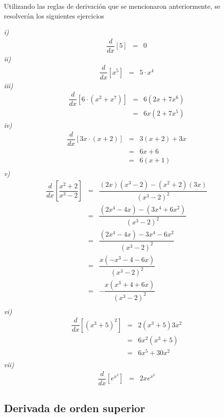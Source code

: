 \begin{myexample}
Utilizando las reglas de derivación que se mencionaron anteriormente, se resolverán los siguientes ejercicios
\end{myexample}
\noindent\textit{i)}
\begin{eqnarray*}
\dfrac{d}{dx}\left[5\right]&=&0
\end{eqnarray*}
\noindent\textit{ii)}
\begin{eqnarray*}
\dfrac{d}{dx}\left[x^{5}\right]&=&5\cdot x^{4}
\end{eqnarray*}
\noindent\textit{iii)}
\begin{eqnarray*}
\dfrac{d}{dx}\left[6\cdot (x^{2}+x^{7})\right]&=&6(2x+7x^{6})\\
&=& 6x(2+7x^{5})
\end{eqnarray*}
\noindent\textit{iv)}
\begin{eqnarray*}
\dfrac{d}{dx}\left[3x\cdot (x+2) \right]&=& 3(x+2)+3x\\
&=& 6x+6\\
&=& 6(x+1)\\
\end{eqnarray*}
\noindent\textit{v)}
\begin{eqnarray*}
\dfrac{d}{dx}\left[ \dfrac{x^{2}+2}{x^{3}-2}\right]&=& \dfrac{(2x)(x^{3}-2)-(x^{2}+2)(3x)}{(x^{3}-2)^{2}}\\
&=& \dfrac{(2x^{4}-4x)-(3x^{4}+6x^{2})}{(x^{3}-2)^{2}}\\
&=& \dfrac{(2x^{4}-4x)-3x^{4}-6x^{2}}{(x^{3}-2)^{2}}\\
&=& \dfrac{x(-x^{3}-4-6x)}{(x^{3}-2)^{2}}\\
&=& -\dfrac{x(x^{3}+4+6x)}{(x^{3}-2)^{2}}\\
\end{eqnarray*}
\noindent\textit{vi)}
\begin{eqnarray*}
\dfrac{d}{dx}\left[(x^{3}+5)^{2} \right]&=&2(x^{3}+5)3x^{2} \\
&=&6x^{2}(x^{3}+5) \\
&=&6x^{5}+30x^{2} \\
\end{eqnarray*}
\noindent\textit{vii)}
\begin{eqnarray*}
\dfrac{d}{dx}\left[e^{x^{2}}\right]&=&2xe^{x^{2}}
\end{eqnarray*}

\subsection{Derivada de orden superior}

